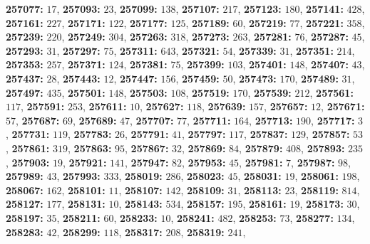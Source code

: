 \textsf{\bfseries 257077:} $17$, \textsf{\bfseries 257093:} $23$, \textsf{\bfseries 257099:} $138$, \textsf{\bfseries 257107:} $217$, \textsf{\bfseries 257123:} $180$, \textsf{\bfseries 257141:} $428$, \textsf{\bfseries 257161:} $227$, \textsf{\bfseries 257171:} $122$, \textsf{\bfseries 257177:} $125$, \textsf{\bfseries 257189:} $60$, \textsf{\bfseries 257219:} $77$, \textsf{\bfseries 257221:} $358$, \textsf{\bfseries 257239:} $220$, \textsf{\bfseries 257249:} $304$, \textsf{\bfseries 257263:} $318$, \textsf{\bfseries 257273:} $263$, \textsf{\bfseries 257281:} $76$, \textsf{\bfseries 257287:} $45$, \textsf{\bfseries 257293:} $31$, \textsf{\bfseries 257297:} $75$, \textsf{\bfseries 257311:} $643$, \textsf{\bfseries 257321:} $54$, \textsf{\bfseries 257339:} $31$, \textsf{\bfseries 257351:} $214$, \textsf{\bfseries 257353:} $257$, \textsf{\bfseries 257371:} $124$, \textsf{\bfseries 257381:} $75$, \textsf{\bfseries 257399:} $103$, \textsf{\bfseries 257401:} $148$, \textsf{\bfseries 257407:} $43$, \textsf{\bfseries 257437:} $28$, \textsf{\bfseries 257443:} $12$, \textsf{\bfseries 257447:} $156$, \textsf{\bfseries 257459:} $50$, \textsf{\bfseries 257473:} $170$, \textsf{\bfseries 257489:} $31$, \textsf{\bfseries 257497:} $435$, \textsf{\bfseries 257501:} $148$, \textsf{\bfseries 257503:} $108$, \textsf{\bfseries 257519:} $170$, \textsf{\bfseries 257539:} $212$, \textsf{\bfseries 257561:} $117$, \textsf{\bfseries 257591:} $253$, \textsf{\bfseries 257611:} $10$, \textsf{\bfseries 257627:} $118$, \textsf{\bfseries 257639:} $157$, \textsf{\bfseries 257657:} $12$, \textsf{\bfseries 257671:} $57$, \textsf{\bfseries 257687:} $69$, \textsf{\bfseries 257689:} $47$, \textsf{\bfseries 257707:} $77$, \textsf{\bfseries 257711:} $164$, \textsf{\bfseries 257713:} $190$, \textsf{\bfseries 257717:} $3$, \textsf{\bfseries 257731:} $119$, \textsf{\bfseries 257783:} $26$, \textsf{\bfseries 257791:} $41$, \textsf{\bfseries 257797:} $117$, \textsf{\bfseries 257837:} $129$, \textsf{\bfseries 257857:} $53$, \textsf{\bfseries 257861:} $319$, \textsf{\bfseries 257863:} $95$, \textsf{\bfseries 257867:} $32$, \textsf{\bfseries 257869:} $84$, \textsf{\bfseries 257879:} $408$, \textsf{\bfseries 257893:} $235$, \textsf{\bfseries 257903:} $19$, \textsf{\bfseries 257921:} $141$, \textsf{\bfseries 257947:} $82$, \textsf{\bfseries 257953:} $45$, \textsf{\bfseries 257981:} $7$, \textsf{\bfseries 257987:} $98$, \textsf{\bfseries 257989:} $43$, \textsf{\bfseries 257993:} $333$, \textsf{\bfseries 258019:} $286$, \textsf{\bfseries 258023:} $45$, \textsf{\bfseries 258031:} $19$, \textsf{\bfseries 258061:} $198$, \textsf{\bfseries 258067:} $162$, \textsf{\bfseries 258101:} $11$, \textsf{\bfseries 258107:} $142$, \textsf{\bfseries 258109:} $31$, \textsf{\bfseries 258113:} $23$, \textsf{\bfseries 258119:} $814$, \textsf{\bfseries 258127:} $177$, \textsf{\bfseries 258131:} $10$, \textsf{\bfseries 258143:} $534$, \textsf{\bfseries 258157:} $195$, \textsf{\bfseries 258161:} $19$, \textsf{\bfseries 258173:} $30$, \textsf{\bfseries 258197:} $35$, \textsf{\bfseries 258211:} $60$, \textsf{\bfseries 258233:} $10$, \textsf{\bfseries 258241:} $482$, \textsf{\bfseries 258253:} $73$, \textsf{\bfseries 258277:} $134$, \textsf{\bfseries 258283:} $42$, \textsf{\bfseries 258299:} $118$, \textsf{\bfseries 258317:} $208$, \textsf{\bfseries 258319:} $241$, 
